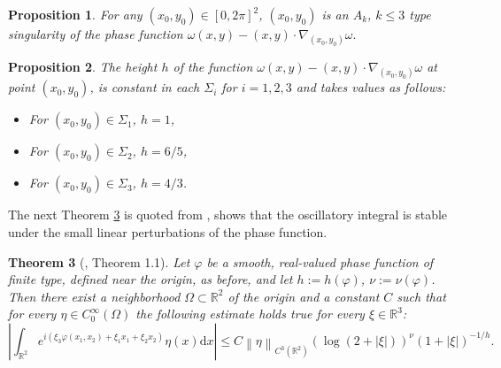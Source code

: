\documentclass[12pt]{amsart}
\newtheorem{theorem}{Theorem}[section]
\newtheorem{proposition}[theorem]{Proposition}
\newcommand\norm[1]{\left\|#1\right\|}
\newcommand{\R}{\mathbb{R}}
\def\d{\mathrm{d}}
\begin{document}
\begin{proposition}\label{prop: velocity space}
    For any $\left(x_{0},y_{0}\right)\in\left[0,2\pi\right]^{2}$, $\left(x_0,y_0\right)$ is an $A_{k}$, $k\leq 3$ type singularity of the phase function $\omega\left(x,y\right)-\left(x,y\right)\cdot\nabla_{\left(x_0,y_0\right)}\omega.$
    
  
    
    
\end{proposition}

\begin{proposition}\label{prop: heights}
    The height $h$ of the function $\omega\left(x,y\right)-\left(x,y\right)\cdot\nabla_{\left(x_0,y_0\right)}\omega$ at point $\left(x_0,y_0\right)$, is constant in each $\Sigma_{i}$ for $i=1,2,3$ and takes values as follows:
    \begin{itemize}
        \item For $\left(x_0,y_0\right)\in\Sigma_{1}$, $h=1$,
        \item For $\left(x_0,y_0\right)\in\Sigma_{2}$, $h=6/5$,
        \item For $\left(x_0,y_0\right)\in\Sigma_{3}$, $h=4/3$.
    \end{itemize}
\end{proposition}
The next Theorem \ref{theorem: linear perturbation} is quoted from \cite{IM11}, shows that the oscillatory integral is stable under the small linear perturbations of the phase function. 
\begin{theorem}[\cite{IM11}, Theorem 1.1]\label{theorem: linear perturbation}
	Let $\varphi$ be a smooth, real-valued phase function of finite type, defined near the origin, as before, and let $h:=h\left(\varphi\right)$, $\nu:=\nu\left(\varphi\right)$. Then there exist a neighborhood $\Omega\subset\R^{2}$ of the origin and a constant $C$ such that for every $\eta\in C^{\infty}_{0}\left(\Omega\right)$ the following estimate holds true for every $\xi\in\R^{3}$:
\begin{equation*}
	\left|\int_{\R^{2}}e^{i\left(\xi_{3}\varphi\left(x_{1},x_{2}\right)+\xi_{1}x_{1}+\xi_{2}x_{2}\right)}\eta\left(x\right)\d x\right|\leq C\norm{\eta}_{C^{3}\left(\R^{2}\right)}\left(\log\left(2+\left|\xi\right|\right)\right)^{\nu}\left(1+\left|\xi\right|\right)^{-1/h}.
\end{equation*}
\end{theorem}
\end{document}
